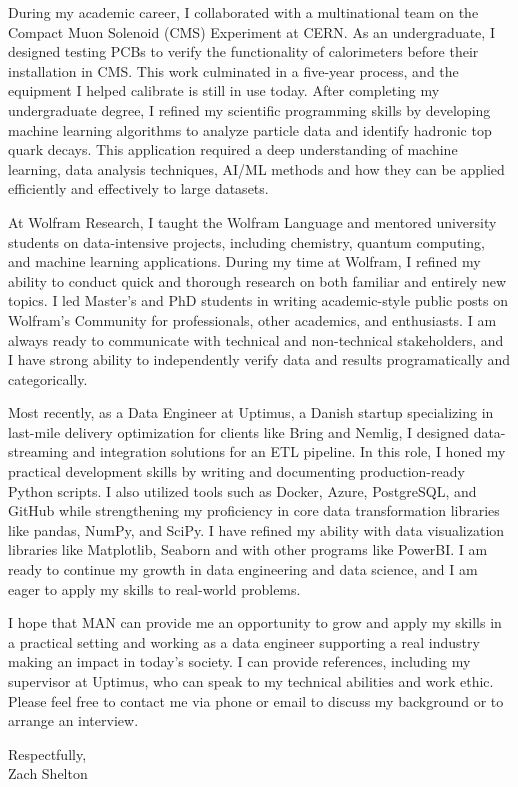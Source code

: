 \documentclass[11pt,a4]{article}
\begin{document}
During my academic career, I collaborated with a multinational team on the Compact Muon Solenoid (CMS) Experiment at CERN. As an undergraduate, I designed testing PCBs to verify the functionality of calorimeters before their installation in CMS. This work culminated in a five-year process, and the equipment I helped calibrate is still in use today. After completing my undergraduate degree, I refined my scientific programming skills by developing machine learning algorithms to analyze particle data and identify hadronic top quark decays. This application required a deep understanding of machine learning, data analysis techniques, AI/ML methods and how they can be applied efficiently and effectively to large datasets.

At Wolfram Research, I taught the Wolfram Language and mentored university students on data-intensive projects, including chemistry, quantum computing, and machine learning applications. During my time at Wolfram, I refined my ability to conduct quick and thorough research on both familiar and entirely new topics. I led Master's and PhD students in writing academic-style public posts on Wolfram's Community for professionals, other academics, and enthusiasts. I am always ready to communicate with technical and non-technical stakeholders, and I have strong ability to independently verify data and results programatically and categorically.

Most recently, as a Data Engineer at Uptimus, a Danish startup specializing in last-mile delivery optimization for clients like Bring and Nemlig, I designed data-streaming and integration solutions for an ETL pipeline. In this role, I honed my practical development skills by writing and documenting production-ready Python scripts. I also utilized tools such as Docker, Azure, PostgreSQL, and GitHub while strengthening my proficiency in core data transformation libraries like pandas, NumPy, and SciPy. I have refined my ability with data visualization libraries like Matplotlib, Seaborn and with other programs like PowerBI. I am ready to continue my growth in data engineering and data science, and I am eager to apply my skills to real-world problems.

I hope that MAN can provide me an opportunity to grow and apply my skills in a practical setting and working as a data engineer supporting a real industry making an impact in today's society. I can provide references, including my supervisor at Uptimus, who can speak to my technical abilities and work ethic. Please feel free to contact me via phone or email to discuss my background or to arrange an interview.
\par

\vspace{0.5cm}
\raggedright
Respectfully, \\ 
Zach Shelton \\ 
\end{document}
